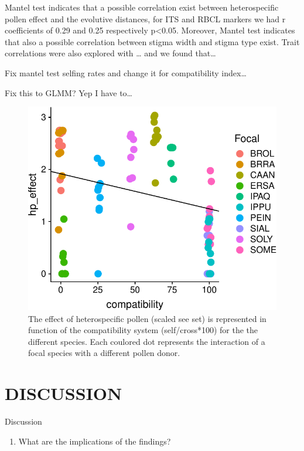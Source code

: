 \documentclass[11pt,a4paper]{article}
\providecommand{\tightlist}{%
  \setlength{\itemsep}{0pt}\setlength{\parskip}{0pt}}
\begin{document}
Mantel test indicates that a possible correlation exist between
heterospecific pollen effect and the evolutive distances, for ITS and
RBCL markers we had r coefficients of 0.29 and 0.25 respectively
p\textless{}0.05. Moreover, Mantel test indicates that also a possible
correlation between stigma width and stigma type exist. Trait
correlations were also explored with \ldots{} and we found that\ldots{}

Fix mantel test selfing rates and change it for compatibility
index\ldots{}

Fix this to GLMM? Yep I have to\ldots{}

\newpage

\begin{figure}
\centering
\includegraphics{output/figures/unnamed-chunk-3-1.pdf}
\caption{The effect of heterospecific pollen (scaled see set) is
represented in function of the compatibility system (self/cross*100) for
the the different species. Each coulored dot represents the interaction
of a focal species with a different pollen donor.}
\end{figure}

\newpage

\section{DISCUSSION}\label{discussion}

Discussion

\begin{enumerate}
\def\labelenumi{\arabic{enumi}.}
\tightlist
\item
  What are the implications of the findings?
\end{enumerate}
\end{document}
